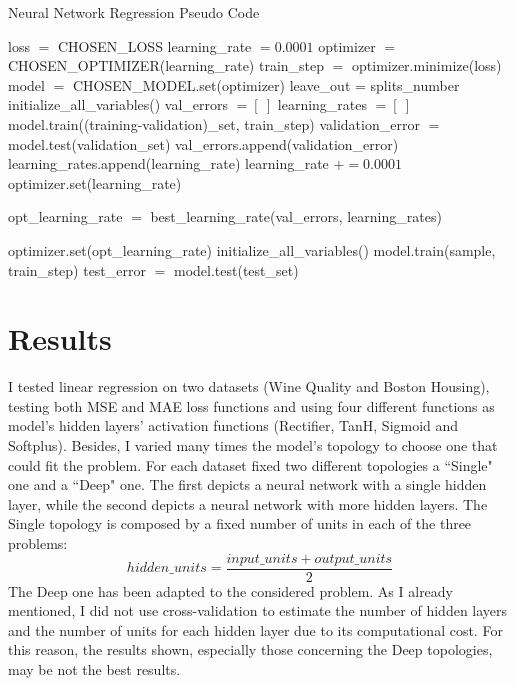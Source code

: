 \documentclass[10pt,journal,A4paper,compsoc,epsfig]{IEEEtran}
\begin{document}
\begin{algorithm}                      %
\caption{Neural Network Regression Pseudo Code}          %
\label{alg1}                           %
\begin{algorithmic}                    %
	\STATE loss $=$ CHOSEN\_LOSS
	\STATE learning\_rate $= 0.0001$
	\STATE optimizer $=$ CHOSEN\_OPTIMIZER(learning\_rate)
	\STATE train\_step $=$ optimizer.minimize(loss)
	\STATE model $=$ CHOSEN\_MODEL.set(optimizer)
	\STATE leave\_out = splits\_number
		\STATE initialize\_all\_variables()
		\STATE val\_errors $= [\ ]$
		\STATE learning\_rates $= [\ ]$
			\STATE model.train((training-validation)\_set, train\_step)
			\STATE validation\_error $=$ model.test(validation\_set)
			\STATE val\_errors.append(validation\_error)
			\STATE learning\_rates.append(learning\_rate)
			\STATE learning\_rate $+= 0.0001$
			\STATE optimizer.set(learning\_rate)
		\ENDFOR
		
		\STATE opt\_learning\_rate $=$ best\_learning\_rate(val\_errors, learning\_rates)
		
		\STATE optimizer.set(opt\_learning\_rate)
		\STATE initialize\_all\_variables()
				\STATE model.train(sample, train\_step)
			\ENDFOR
			\STATE test\_error $=$ model.test(test\_set)
		\ENDFOR
	\ENDWHILE
\end{algorithmic}
\end{algorithm}







\section{Results}
I tested linear regression on two datasets (Wine Quality and Boston Housing), testing both MSE and MAE loss functions and using four different functions as model's hidden layers' activation functions (Rectifier, TanH, Sigmoid and Softplus). Besides, I varied many times the model's topology to choose one that could fit the problem. For each dataset fixed two different topologies a ``Single" one and a ``Deep" one. The first depicts a neural network with a single hidden layer, while the second depicts a neural network with more hidden layers. The Single topology is composed by a fixed number of units in each of the three problems:
\begin{equation}
hidden\_units = \dfrac{input\_units + output\_units}{2}
\end{equation}
The Deep one has been adapted to the considered problem. As I already mentioned, I did not use cross-validation to estimate the number of hidden layers and the number of units for each hidden layer due to its computational cost. For this reason, the results shown, especially those concerning the Deep topologies, may be not the best results.
\end{document}
